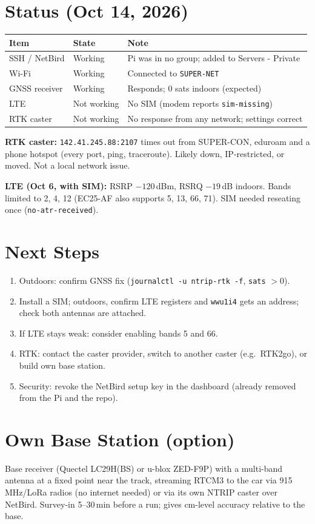\documentclass{article}
\begin{document}
\section{Status (Oct 14, 2026)}
\begin{tabular}{@{}lll@{}}
\toprule
Item & State & Note \\
\midrule
SSH / NetBird   & Working     & Pi was in no group; added to Servers - Private \\
Wi-Fi           & Working     & Connected to \texttt{SUPER-NET} \\
GNSS receiver   & Working     & Responds; 0 sats indoors (expected) \\
LTE             & Not working & No SIM (modem reports \texttt{sim-missing}) \\
RTK caster      & Not working & No response from any network; settings correct \\
\bottomrule
\end{tabular}

\medskip
\textbf{RTK caster:} \texttt{142.41.245.88:2107} times out from SUPER-CON, eduroam and a phone hotspot
(every port, ping, traceroute). Likely down, IP-restricted, or moved. Not a local network issue.

\textbf{LTE (Oct 6, with SIM):} RSRP $-120$\,dBm, RSRQ $-19$\,dB indoors. Bands limited to 2, 4, 12
(EC25-AF also supports 5, 13, 66, 71). SIM needed reseating once (\texttt{no-atr-received}).

\section{Next Steps}
\begin{enumerate}
  \item Outdoors: confirm GNSS fix (\texttt{journalctl -u ntrip-rtk -f}, \texttt{sats} $> 0$).
  \item Install a SIM; outdoors, confirm LTE registers and \texttt{wwu1i4} gets an address; check both antennas are attached.
  \item If LTE stays weak: consider enabling bands 5 and 66.
  \item RTK: contact the caster provider, switch to another caster (e.g.\ RTK2go), or build own base station.
  \item Security: revoke the NetBird setup key in the dashboard (already removed from the Pi and the repo).
\end{enumerate}

\section{Own Base Station (option)}
Base receiver (Quectel LC29H(BS) or u-blox ZED-F9P) with a multi-band antenna at a fixed point near the track,
streaming RTCM3 to the car via 915\,MHz/LoRa radios (no internet needed) or via its own NTRIP caster over NetBird.
Survey-in 5--30\,min before a run; gives cm-level accuracy relative to the base.
\end{document}
